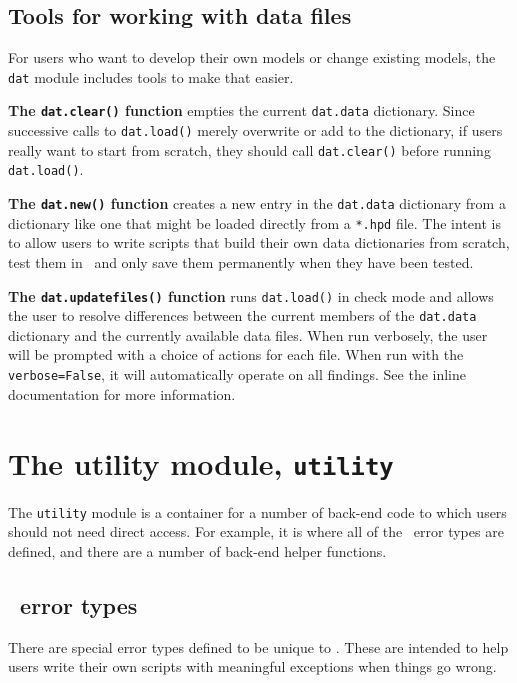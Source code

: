 \subsection{Tools for working with data files}\label{sec:regdat:tools}

For users who want to develop their own models or change existing models, the \texttt{dat} module includes tools to make that easier.  

{\bf The \texttt{dat.clear()} function} empties the current \texttt{dat.data} dictionary.  Since successive calls to \texttt{dat.load()} merely overwrite or add to the dictionary, if users really want to start from scratch, they should call \texttt{dat.clear()} before running \texttt{dat.load()}.

{\bf The \texttt{dat.new()} function} creates a new entry in the \texttt{dat.data} dictionary from a dictionary like one that might be loaded directly from a \texttt{*.hpd} file.  The intent is to allow users to write scripts that build their own data dictionaries from scratch, test them in \PM\ and only save them permanently when they have been tested.

{\bf The \texttt{dat.updatefiles()} function} runs \texttt{dat.load()} in check mode and allows the user to resolve differences between the current members of the \texttt{dat.data} dictionary and the currently available data files.  When run verbosely, the user will be prompted with a choice of actions for each file.  When run with the \texttt{verbose=False}, it will automatically operate on all findings.  See the inline documentation for more information.

\section{The utility module, \texttt{utility}}

The \texttt{utility} module is a container for a number of back-end code to which users should not need direct access.  For example, it is where all of the \PM\ error types are defined, and there are a number of back-end helper functions.

\subsection{\PM\ error types}

There are special error types defined to be unique to \PM.  These are intended to help users write their own scripts with meaningful exceptions when things go wrong.

